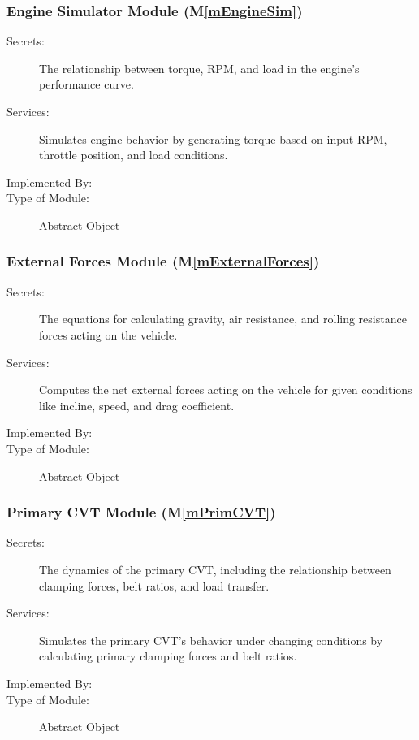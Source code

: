 \documentclass[12pt, titlepage]{article}
\newcommand{\mref}[1]{M\ref{#1}}
\begin{document}
\subsubsection{Engine Simulator Module (\mref{mEngineSim})}

\begin{description}
\item[Secrets:] The relationship between torque, RPM, and load in the engine's performance curve.
\item[Services:] Simulates engine behavior by generating torque based on input RPM, throttle position, and load conditions.
\item[Implemented By:] \progname{}
\item[Type of Module:] Abstract Object
\end{description}

\subsubsection{External Forces Module (\mref{mExternalForces})}

\begin{description}
\item[Secrets:] The equations for calculating gravity, air resistance, and rolling resistance forces acting on the vehicle.
\item[Services:] Computes the net external forces acting on the vehicle for given conditions like incline, speed, and drag coefficient.
\item[Implemented By:] \progname{}
\item[Type of Module:] Abstract Object
\end{description}

\subsubsection{Primary CVT Module (\mref{mPrimCVT})}

\begin{description}
\item[Secrets:] The dynamics of the primary CVT, including the relationship between clamping forces, belt ratios, and load transfer.
\item[Services:] Simulates the primary CVT's behavior under changing conditions by calculating primary clamping forces and belt ratios.
\item[Implemented By:] \progname{}
\item[Type of Module:] Abstract Object
\end{description}
\end{document}
